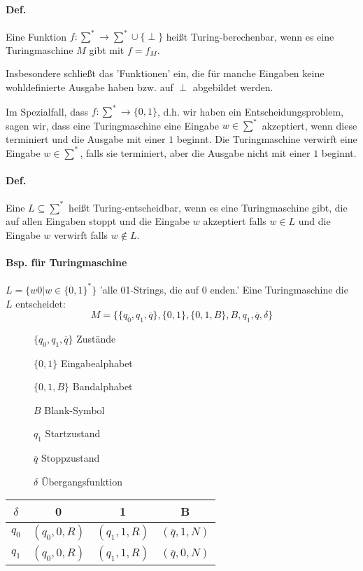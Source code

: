 \paragraph*{Def.} Eine Funktion $f:\sum^* \rightarrow\sum^* \cup \{ \perp \}$ heißt Turing-berechenbar, wenn es eine Turingmaschine $M$ gibt mit $f=f_M$.

\par\medskip
Insbesondere schließt das 'Funktionen' ein, die für manche Eingaben keine wohldefinierte Ausgabe haben bzw. auf $\perp$ abgebildet werden.\par\medskip

Im Spezialfall, dass $f:\sum^* \rightarrow \{ 0,1 \}$, d.h. wir haben ein Entscheidungsproblem, sagen wir, dass eine Turingmaschine eine Eingabe $w \in \sum^*$ akzeptiert, wenn diese terminiert und die Ausgabe mit einer $1$ beginnt. Die Turingmaschine verwirft eine Eingabe $w \in \sum^*$, falls sie terminiert, aber die Ausgabe nicht mit einer $1$ beginnt.\par\medskip

\paragraph*{Def.} Eine $L \subseteq \sum^*$ heißt Turing-entscheidbar, wenn es eine Turingmaschine gibt, die auf allen Eingaben stoppt und die Eingabe $w$ akzeptiert falls $w \in L$ und die Eingabe $w$ verwirft falls $w \not\in L$.

\paragraph*{Bsp. für Turingmaschine} $L=\{ w0|w \in \{ 0,1 \}^* \}$ 'alle 01-Strings, die auf 0 enden.' Eine Turingmaschine die $L$ entscheidet: $$ M=\{ \{q_0,q_1,\overline{q}\}, \{0,1\}, \{0,1,B\}, B, q_1, \overline{q}, \delta \} $$
\begin{description}
	\item[] $\{q_0,q_1,\overline{q}\}$ Zustände
	\item[] $\{0,1\}$ Eingabealphabet
	\item[] $\{0,1,B\}$ Bandalphabet
	\item[] $B$ Blank-Symbol
	\item[] $q_1$ Startzustand
	\item[] $\overline{q}$ Stoppzustand
	\item[] $\delta$ Übergangsfunktion
\end{description}

\begin{table}[htb!]
\centering
\begin{tabular}{c|c c c}
$\delta$ & 0 & 1 & B \\
\hline 
$q_0$ & $(q_0,0,R)$ & $(q_1,1,R)$ & $(\overline{q},1,N)$ \\
$q_1$ & $(q_0,0,R)$ & $(q_1,1,R)$ & $(\overline{q},0,N)$ \\
\end{tabular}
\end{table}

